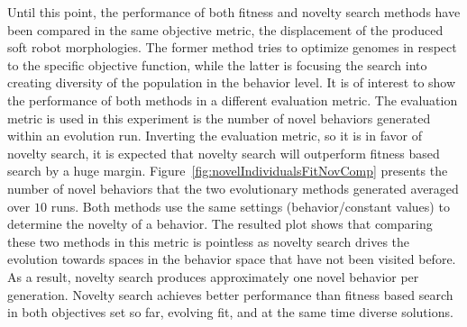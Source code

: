 Until this point, the performance of both fitness and novelty search methods have been compared in the same objective metric, the displacement of the produced soft robot morphologies. The former method tries to optimize genomes in respect to the specific objective function, while the latter is focusing the search into creating diversity of the population in the behavior level. It is of interest to show the performance of both methods in a different evaluation metric. The evaluation metric is used in this experiment is the number of novel behaviors generated within an evolution run. Inverting the evaluation metric, so it is in favor of novelty search, it is expected that novelty search will outperform fitness based search by a huge margin. Figure~\ref{fig:novelIndividualsFitNovComp} presents the number of novel behaviors that the two evolutionary methods generated averaged over $10$ runs. Both methods use the same settings (behavior/constant values) to determine the novelty of a behavior. The resulted plot shows that comparing these two methods in this metric is pointless as novelty search drives the evolution towards spaces in the behavior space that have not been visited before. As a result, novelty search produces approximately one novel behavior per generation. Novelty search achieves better performance than fitness based search in both objectives set so far, evolving fit, and at the same time diverse solutions.
